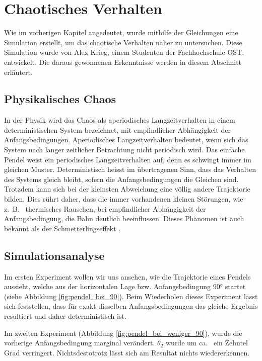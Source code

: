 \section{Chaotisches Verhalten}
Wie im vorherigen Kapitel angedeutet, wurde mithilfe der Gleichungen eine Simulation erstellt,
um das chaotische Verhalten näher zu untersuchen.
Diese Simulation wurde von Alex Krieg, einem Studenten der Fachhochschule OST, entwickelt.
Die daraus gewonnenen Erkenntnisse werden in diesem Abschnitt erläutert.


\subsection{Physikalisches Chaos}
In der Physik wird das Chaos als aperiodisches Langzeitverhalten in einem deterministischen
System bezeichnet, mit empfindlicher Abhängigkeit der Anfangsbedingungen.
Aperiodisches Langzeitverhalten bedeutet, wenn sich das System nach langer zeitlicher Betrachtung
nicht periodisch wird.
Das einfache Pendel weist ein periodisches Langzeitverhalten auf,
denn es schwingt immer im gleichen Muster.
Deterministisch heisst im übertragenen Sinn, dass das Verhalten des Systems gleich bleibt,
sofern die Anfangsbedingungen die Gleichen sind.
Trotzdem kann sich bei der kleinsten Abweichung eine völlig andere Trajektorie bilden.
Dies rührt daher, dass die immer vorhandenen kleinen Störungen, wie z.~B.~ thermisches Rauschen,
bei empfindlicher Abhängigkeit der Anfangsbedingung, die Bahn deutlich beeinflussen.
Dieses Phänomen ist auch bekannt als der Schmetterlingseffekt \cite{doppelpendel:schmetterlingseffekt}.

\subsection{Simulationsanalyse}
Im ersten Experiment wollen wir uns ansehen, wie die Trajektorie eines Pendels aussieht,
welche aus der horizontalen Lage bzw. Anfangsbedingung 90° startet
(siehe Abbildung \ref{fig:pendel_bei_90}).
Beim Wiederholen dieses Experiment lässt sich feststellen, dass für exakt dieselben Anfangsbedingungen
das gleiche Ergebnis resultiert und daher deterministisch ist.

Im zweiten Experiment (Abbildung \ref{fig:pendel_bei_weniger_90}), wurde die vorherige
Anfangsbedingung marginal verändert.
\(\theta_2\) wurde um ca.~ ein Zehntel Grad verringert.
Nichtsdestotrotz lässt sich am Resultat nichts wiedererkennen.

